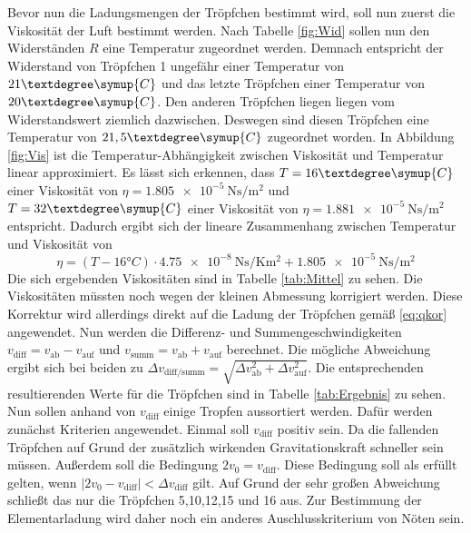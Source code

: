 \noindent Bevor nun die Ladungsmengen der Tröpfchen bestimmt wird, soll nun zuerst die Viskosität der Luft bestimmt werden.
Nach Tabelle \ref{fig:Wid} sollen nun den Widerständen $R$ eine Temperatur zugeordnet werden. Demnach entspricht der
Widerstand von Tröpfchen 1 ungefähr einer Temperatur von $21°\symup{C}$ und das letzte Tröpfchen einer Temperatur von $20°\symup{C}$. Den anderen Tröpfchen
liegen liegen vom Widerstandswert ziemlich dazwischen. Deswegen sind diesen Tröpfchen eine Temperatur von $21,5°\symup{C}$ zugeordnet worden.
In Abbildung \ref{fig:Vis} ist die Temperatur-Abhängigkeit zwischen Viskosität und Temperatur linear approximiert.
Es lässt sich erkennen, dass $T=16°\symup{C}$ einer Viskosität von $\eta=\qty{1.805e-5}{\newton\second\per\meter\squared}$
und $T=32°\symup{C}$ einer Viskosität von $\eta=\qty{1.881e-5}{\newton\second\per\meter\squared}$ entspricht.
Dadurch ergibt sich der lineare Zusammenhang zwischen Temperatur und Viskosität von
\begin{equation}
    \eta=(T-16°C)\cdot \qty{4.75e-8}{\newton\second\per\kelvin\meter\squared}+\qty{1.805e-5}{\newton\second\per\meter\squared}
\end{equation}
Die sich ergebenden Viskositäten sind in Tabelle \ref{tab:Mittel} zu sehen. Die Viskositäten müssten noch wegen der kleinen Abmessung
korrigiert werden. Diese Korrektur wird allerdings direkt auf die Ladung der Tröpfchen gemäß \eqref{eq:qkor}
angewendet. Nun werden die Differenz- und Summengeschwindigkeiten $v_\text{diff}=v_\text{ab}-v_\text{auf} $ und $v_\text{summ}=v_\text{ab}+v_\text{auf}$
berechnet. Die mögliche Abweichung ergibt sich bei beiden zu $\Delta v_\text{diff/summ}=\sqrt{\Delta v_\text{ab}^2+\Delta v_\text{auf}^2}$.
Die entsprechenden resultierenden Werte für die Tröpfchen sind in Tabelle \ref{tab:Ergebnis} zu sehen.
Nun sollen anhand von $v_\text{diff}$ einige Tropfen aussortiert werden. Dafür werden zunächst Kriterien angewendet.
Einmal soll $v_\text{diff}$ positiv sein. Da die fallenden Tröpfchen auf Grund der zusätzlich wirkenden Gravitationskraft schneller sein müssen.
Außerdem soll die Bedingung $2v_0=v_\text{diff}$. Diese Bedingung soll als erfüllt gelten, wenn 
$\left|2v_0-v_\text{diff}\right|<\Delta v_\text{diff}$ gilt. Auf Grund der sehr großen Abweichung schließt das nur 
die Tröpfchen 5,10,12,15 und 16 aus. Zur Bestimmung der Elementarladung wird daher noch ein anderes Auschlusskriterium von
Nöten sein.
